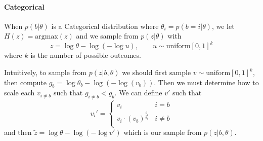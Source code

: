 \documentclass{article}
\begin{document}
\paragraph{Categorical} When $p(b|\theta)$ is a Categorical distribution where $\theta_i = p(b=i|\theta)$, we let $H(z) = \text{argmax}(z)$ and we sample from $p(z|\theta)$ with 
$$ z = \log\theta -\log(-\log u), \qquad u \sim \text{uniform}[0,1]^k
$$ where $k$ is the number of possible outcomes.

Intuitively, to sample from $p(z|b, \theta)$ we should first sample $v\sim \text{uniform}[0, 1]^k$, then compute $g_b = \log\theta_b -\log(-\log(v_b))$. Then we must determine how to scale each $v_{i\neq b}$ such that $g_{i\neq b} < g_b$. We can define $v'$ such that
\[
v_i' =    \left\{
\begin{array}{ll}
      v_i & i = b \\
      v_i\cdot(v_b)^{\frac{\theta_i}{\theta_b}} & i \neq b \\
\end{array} 
\right.
\] and then $\tilde{z} = \log\theta - \log(-\log v')$ which is our sample from $p(z|b, \theta)$. 


\end{document}

